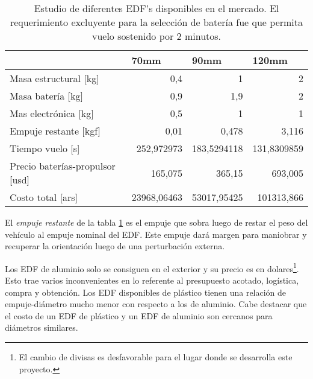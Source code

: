 \begin{table}[!ht]
    \centering
    \begin{tabular}{l|r|r|r|}
    & \multicolumn{1}{l|}{70mm} & \multicolumn{1}{l|}{90mm} & \multicolumn{1}{l|}{120mm} \\ \hline
    Masa estructural {[}kg{]}           & 0,4                       & 1                         & 2                          \\ \hline
    Masa batería       {[}kg{]}                 & 0,9                       & 1,9                       & 2                          \\ \hline
    Mas electrónica {[}kg{]}            & 0,5                       & 1                         & 1                          \\ \hline
    Empuje restante {[}kgf{]}           & 0,01                      & 0,478                     & 3,116                      \\ \hline
    Tiempo vuelo {[}s{]}                & 252,972973                & 183,5294118               & 131,8309859                \\ \hline
    Precio baterías-propulsor {[}usd{]} & 165,075                   & 365,15                    & 693,005                    \\ \hline
    Costo total {[}ars{]}               & 23968,06463               & 53017,95425               & 101313,866                 \\ \hline
    \end{tabular}
    \caption{Estudio de diferentes EDF's disponibles en el mercado. El requerimiento excluyente para la selección de batería fue que permita vuelo sostenido por 2 minutos.}
    \label{tab:edfseleccion}
\end{table}


El \textit{empuje restante} de la tabla \ref{tab:edfseleccion} es el empuje que sobra luego de restar el peso del vehículo al empuje nominal del EDF. Este empuje dará margen para maniobrar y recuperar la orientación luego de una perturbación externa.

\medskip

Los EDF de aluminio solo se consiguen en el exterior y su precio es en dolares\footnote{El cambio de divisas es desfavorable para el lugar donde se desarrolla este proyecto.}. Esto trae varios inconvenientes en lo referente al presupuesto acotado, logística, compra y obtención. Los EDF
disponibles de plástico tienen una relación de empuje-diámetro mucho menor con respecto a
los de aluminio. Cabe destacar que el costo de un EDF de plástico y un EDF de aluminio son cercanos para diámetros similares.

